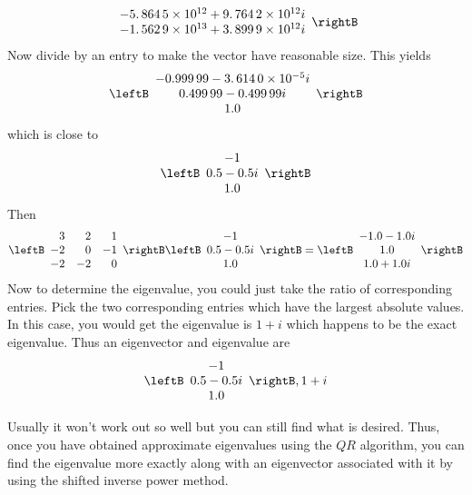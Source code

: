 \begin{solution}
\begin{equation*}
\begin{array}{c}
-5.\,\allowbreak 864\,5\times 10^{12}+9.\,\allowbreak 764\,2\times 10^{12}i
\\ 
-1.\,\allowbreak 562\,9\times 10^{13}+3.\,\allowbreak 899\,9\times 10^{12}i
\end{array}
\rightB
\end{equation*}
Now divide by an entry to make the vector have reasonable size. This yields 
\begin{equation*}
\leftB 
\begin{array}{c}
-0.999\,99-3.\,\allowbreak 614\,0\times 10^{-5}i \\ 
0.499\,99-0.499\,99i \\ 
1.0
\end{array}
\rightB
\end{equation*}
which is close to 
\begin{equation*}
\leftB 
\begin{array}{c}
-1 \\ 
0.5-0.5i \\ 
1.0
\end{array}
\rightB
\end{equation*}
Then 
\begin{equation*}
\leftB 
\begin{array}{rrr}
3 & 2 & 1 \\ 
-2 & 0 & -1 \\ 
-2 & -2 & 0
\end{array}
\rightB \leftB 
\begin{array}{c}
-1 \\ 
0.5-0.5i \\ 
1.0
\end{array}
\rightB =\leftB 
\begin{array}{c}
-1.0-1.0i \\ 
1.0 \\ 
1.0+1.0i
\end{array}
\rightB 
\end{equation*}
Now to determine the eigenvalue, you could just take the ratio of
corresponding entries. Pick the two corresponding entries which have the
largest absolute values. In this case, you would get the eigenvalue is $1+i$
which happens to be the exact eigenvalue. Thus an eigenvector and eigenvalue
are 
\begin{equation*}
\leftB 
\begin{array}{c}
-1 \\ 
0.5-0.5i \\ 
1.0
\end{array}
\rightB, 1+i
\end{equation*}
\end{solution}

Usually it won't work out so well but you can still find what is desired.
Thus, once you have obtained approximate eigenvalues using the $QR$
algorithm, you can find the eigenvalue more exactly along with an
eigenvector associated with it by using the shifted inverse power method.